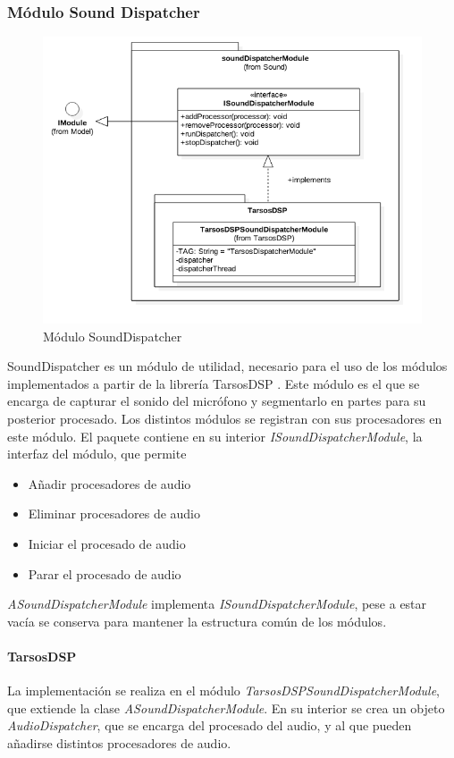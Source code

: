\subsubsection{Módulo Sound Dispatcher}
\begin{figure}
	\centering
	\includegraphics[width=1\linewidth]{imagenes/diagramas/SoundDispatcherModule.png}
	\caption{Módulo SoundDispatcher}
	\label{fig:sound-dispatcher-module}
\end{figure}
SoundDispatcher es un módulo de utilidad, necesario para el uso de los módulos implementados a partir de la librería TarsosDSP \cite{six2014tarsosdsp}.
Este módulo es el que se encarga de capturar el sonido del micrófono y segmentarlo en partes para su posterior procesado. Los distintos módulos se registran con sus procesadores en este módulo.
El paquete contiene en su interior \textit{ISoundDispatcherModule}, la interfaz del módulo, que permite
\begin{itemize}
	\item Añadir procesadores de audio
	\item Eliminar procesadores de audio
	\item Iniciar el procesado de audio
	\item Parar el procesado de audio
\end{itemize}
\textit{ASoundDispatcherModule} implementa \textit{ISoundDispatcherModule}, pese a estar vacía se conserva para mantener la estructura común de los módulos.
\paragraph*{TarsosDSP\\}
La implementación se realiza en el módulo \textit{TarsosDSPSoundDispatcherModule}, que extiende la clase \textit{ASoundDispatcherModule}.
En su interior se crea un objeto \textit{AudioDispatcher}, que se encarga del procesado del audio, y al que pueden añadirse distintos procesadores de audio.


